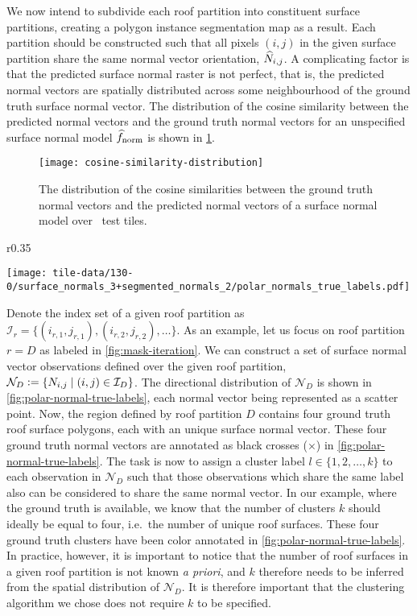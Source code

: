 We now intend to subdivide each roof partition into constituent surface partitions, creating a polygon instance segmentation map as a result.
Each partition should be constructed such that all pixels $(i, j)$ in the given surface partition share the same normal vector orientation, $\widehat{N}_{i,j}$.
A complicating factor is that the predicted surface normal raster is not perfect, that is, the predicted normal vectors are spatially distributed across some neighbourhood of the ground truth surface normal vector.
The distribution of the cosine similarity between the predicted normal vectors and the ground truth normal vectors for an unspecified surface normal model $\widehat{f}_{\mathrm{norm}}$ is shown in \cref{fig:cosine-similarity-distribution}.
\begin{figure}[H]
  \centering
  \texttt{[image: cosine-similarity-distribution]}
  \caption{%
    The distribution of the cosine similarities between the ground truth normal vectors and the predicted normal vectors of a surface normal model over \numtesttiles~test tiles.
  }%
  \label{fig:cosine-similarity-distribution}
\end{figure}
\begin{wrapfigure}{r}{0.35\textwidth}
  \begin{center}
    \texttt{[image: tile-data/130-0/surface\_normals\_3+segmented\_normals\_2/polar\_normals\_true\_labels.pdf]}
  \end{center}
  \caption{Ground truth labeling of predicted normal vectors.}%
  \label{fig:polar-normal-true-labels}
\end{wrapfigure}
\noindent
Denote the index set of a given roof partition as $\mathcal{I}_{r} = \{(i_{r,1}, j_{r,1}), (i_{r,2}, j_{r,2}), \ldots\}$.
As an example, let us focus on roof partition $r=D$ as labeled in \cref{fig:mask-iteration}.
We can construct a set of surface normal vector observations defined over the given roof partition, $\mathcal{N}_{D} \vcentcolon= \{N_{i,j} \mid (i, j) \in \mathcal{I}_{D}\}$.
The directional distribution of $\mathcal{N}_{D}$ is shown in \cref{fig:polar-normal-true-labels}, each normal vector being represented as a scatter point.
Now, the region defined by roof partition $D$ contains four ground truth roof surface polygons, each with an unique surface normal vector.
These four ground truth normal vectors are annotated as black crosses ($\times$) in \cref{fig:polar-normal-true-labels}.
The task is now to assign a cluster label $l \in \{1, 2, \ldots, k\}$ to each observation in $\mathcal{N}_D$ such that those observations which share the same label also can be considered to share the same normal vector.
In our example, where the ground truth is available, we know that the number of clusters $k$ should ideally be equal to four, i.e.\ the number of unique roof surfaces.
These four ground truth clusters have been color annotated in \cref{fig:polar-normal-true-labels}.
In practice, however, it is important to notice that the number of roof surfaces in a given roof partition is not known \textit{a priori}, and $k$ therefore needs to be inferred from the spatial distribution of $\mathcal{N}_{D}$.
It is therefore important that the clustering algorithm we chose does not require $k$ to be specified.

